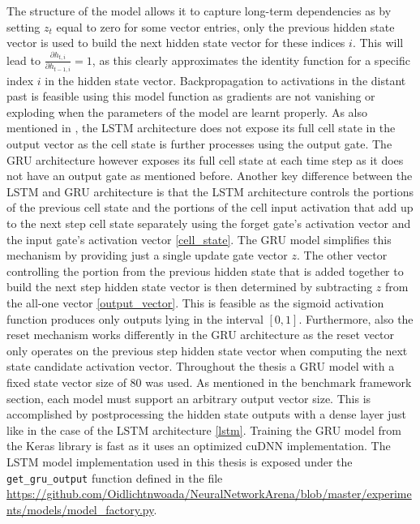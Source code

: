 \documentclass[draft,final]{vutinfth} %
\begin{document}
    The structure of the model allows it to capture long-term dependencies as by setting $z_t$ equal to zero for some vector entries, only the previous hidden state vector is used to build the next hidden state vector for these indices $i$.
    This will lead to $\frac{\partial{h_{t,i}}}{\partial{h_{t-1,i}}} = 1$, as this clearly approximates the identity function for a specific index $i$ in the hidden state vector.
    Backpropagation to activations in the distant past is feasible using this model function as gradients are not vanishing or exploding when the parameters of the model are learnt properly.
    As also mentioned in \cite[p. 5]{GRU}, the LSTM architecture does not expose its full cell state in the output vector as the cell state is further processes using the output gate.
    The GRU architecture however exposes its full cell state at each time step as it does not have an output gate as mentioned before.
    Another key difference between the LSTM and GRU architecture is that the LSTM architecture controls the portions of the previous cell state and the portions of the cell input activation that add up to the next step cell state separately using the forget gate's activation vector and the input gate's activation vector \ref{cell_state}.
    The GRU model simplifies this mechanism by providing just a single update gate vector $z$.
    The other vector controlling the portion from the previous hidden state that is added together to build the next step hidden state vector is then determined by subtracting $z$ from the all-one vector \ref{output_vector}.
    This is feasible as the sigmoid activation function produces only outputs lying in the interval $[0,1]$. 
    Furthermore, also the reset mechanism works differently in the GRU architecture as the reset vector only operates on the previous step hidden state vector when computing the next state candidate activation vector.
    Throughout the thesis a GRU model with a fixed state vector size of $80$ was used. As mentioned in the benchmark framework section, each model must support an arbitrary output vector size.
    This is accomplished by postprocessing the hidden state outputs with a dense layer just like in the case of the LSTM architecture \ref{lstm}.
    Training the GRU model from the Keras library is fast as it uses an optimized cuDNN \cite{cuDNN} implementation.
    The LSTM model implementation used in this thesis is exposed under the \texttt{get\_gru\_output} function defined in the file \url{https://github.com/Oidlichtnwoada/NeuralNetworkArena/blob/master/experiments/models/model_factory.py}.
 
\end{document}
